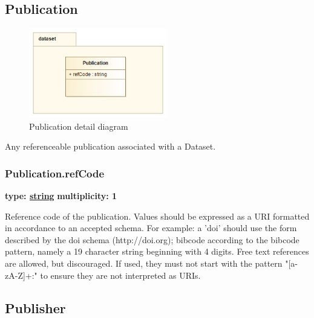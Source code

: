   
\pagebreak
\subsection{Publication}
\label{sect:publication}

  \begin{figure}[h]
  \begin{center}
    \includegraphics[width=2.375in]{diagrams/Publication.png}
    \caption{ Publication detail diagram}\label{fig:publication}
  \end{center}
  \end{figure}

  Any referenceable publication associated with a Dataset.

  \subsubsection{Publication.refCode}
  \textbf{type: \hyperref[sect:ivoa]{string}} \newline
  \textbf{multiplicity: 1} \newline
  
  Reference code of the publication. Values should be expressed as a URI
  formatted in accordance to an accepted schema. For example: a 'doi' should use
  the form described by the doi schema (http://doi.org); bibcode according to
  the bibcode pattern, namely a 19 character string beginning with 4 digits.
  Free text references are allowed, but discouraged. If used, they must not
  start with the pattern "[a-zA-Z]+:" to ensure they are not interpreted as URIs.
  

\pagebreak
\subsection{Publisher}
\label{sect:publisher}

